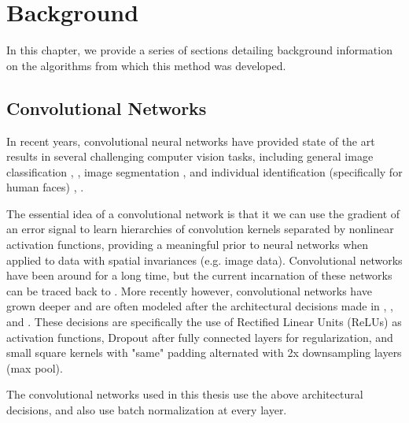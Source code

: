  
\chapter{Background} \label{sec:background}

In this chapter, we provide a series of sections detailing background information on the algorithms from which this method was developed.

\section{Convolutional Networks}

In recent years, convolutional neural networks have provided state of the art results in several challenging computer vision tasks, including general image classification \cite{krizhevsky2012imagenet}, \cite{szegedy2015going}, image segmentation \cite{long2015fully}, \cite{chen2014semantic} and individual identification (specifically for human faces) \cite{fan2014learning}, \cite{schroff2015facenet}.

The essential idea of a convolutional network is that it we can use the gradient of an error signal to learn hierarchies of convolution kernels separated by nonlinear activation functions, providing a meaningful prior to neural networks when applied to data with spatial invariances (e.g. image data).
Convolutional networks have been around for a long time, but the current incarnation of these networks can be traced back to \cite{lecun1998gradient}.
More recently however, convolutional networks have grown deeper and are often modeled after the architectural decisions made in \cite{simonyan2014very}, \cite{sermanet2013overfeat}, and \cite{krizhevsky2012imagenet}.
These decisions are specifically the use of Rectified Linear Units (ReLUs) as activation functions, Dropout \cite{hinton2012improving} after fully connected layers for regularization, and small square kernels with "same" padding alternated with 2x downsampling layers (max pool).

The convolutional networks used in this thesis use the above architectural decisions, and also use batch normalization \cite{ioffe2015batch} at every layer.

